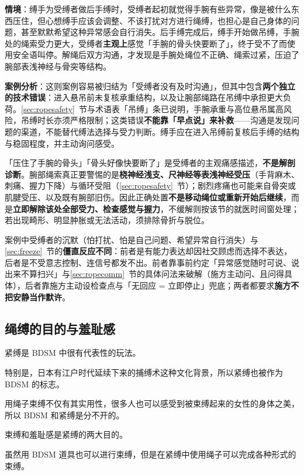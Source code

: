 \documentclass[12pt,UTF8]{ctexbook}
\begin{document}
\noindent\textbf{情境}：缚手为受缚者做后手缚时，受缚者起初就觉得手腕有些异常，像是被什么东西压住，但心想缚手应该会调整、不该打扰对方进行绳缚，也担心是自己身体的问题，甚至默默希望这种异常感会自行消失。后手缚完成后，缚手开始做吊缚，手腕处的绳索受力更大，受缚者\textbf{主观上}感觉「手腕的骨头快要断了」，终于受不了而使用安全语叫停。解绳后双方沟通，才发现是手腕处绳位不正确、绳索过紧，压迫了腕部表浅神经与骨突等结构。

\noindent\textbf{案例分析}：这则案例容易被归结为「受缚者没有及时沟通」，但其中包含\textbf{两个独立的技术错误}：进入悬吊前未复核承重结构，以及让腕部绳路在吊缚中承担更大负荷。\ref{sec:ropesafety}~节与术语表「吊缚」条已说明，手腕承重与高位悬吊属高风险，吊缚时长亦须严格限制；这类错误\textbf{不能靠「早点说」来补救}——沟通是发现问题的渠道，不能替代缚法选择与受力判断。缚手应在进入吊缚前复核后手缚的结构与稳固程度，并主动询问感受。

\noindent「压住了手腕的骨头」「骨头好像快要断了」是受缚者的主观痛感描述，\textbf{不是解剖诊断}。腕部绳索真正要警惕的是\textbf{桡神经浅支、尺神经等表浅神经受压}（手背麻木、刺痛、握力下降）与循环受阻（\ref{sec:ropesafety}~节）；剧烈疼痛也可能来自骨突或肌腱受压、以及既有腕部旧伤。因此正确处置\textbf{不是移动绳位或重新开始后继续}，而是\textbf{立即解除该处全部受力、检查感觉与握力}，不缓解则按该节的就医时间窗处理；若出现畸形、明显肿胀或无法活动，须排除骨折与脱位。

\noindent 案例中受缚者的沉默（怕打扰、怕是自己问题、希望异常自行消失）与\ref{sec:freeze}~节的\textbf{僵直反应不同}：前者是有能力表达却因社交顾虑而选择不表达，后者是不受意志控制、连信号都发不出。前者靠事前约定「异常感觉随时可说、说出来不算扫兴」与\ref{sec:ropecomm}~节的具体问法来破解（施方主动问、且问得具体），后者靠施方主动设检查点与「无回应 = 立即停止」兜底；两者都要求\textbf{施方不把安静当作默许}。

\subsection{绳缚的目的与羞耻感}

紧缚是 BDSM 中很有代表性的玩法。

特别是，日本有江户时代延续下来的捕缚术这种文化背景，所以紧缚也被作为 BDSM 的标志。

用绳子束缚不仅有其实用性，很多人也可以感受到被束缚起来的女性的身体之美，所以 BDSM 和紧缚是分不开的。

束缚和羞耻感是紧缚的两大目的。

虽然用 BDSM 道具也可以进行束缚，但是在紧缚中使用绳子可以完成各种形式的束缚。
\end{document}
